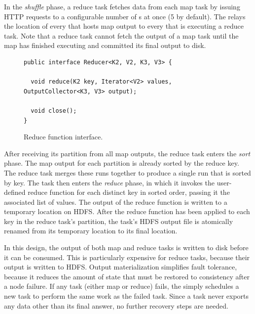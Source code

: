 In the \emph{shuffle} phase, a reduce task fetches data from each map task by
issuing HTTP requests to a configurable number of {\TT}s at once (5 by
default). The {\JT} relays the location of every {\TT} that hosts map output to
every {\TT} that is executing a reduce task. Note that a reduce task cannot
fetch the output of a map task until the map has finished executing and
committed its final output to disk.

\begin{figure}[t]
\ssp
\begin{minipage}{\linewidth}
\begin{verbatim}
public interface Reducer<K2, V2, K3, V3> {

  void reduce(K2 key, Iterator<V2> values, OutputCollector<K3, V3> output);

  void close();
}
\end{verbatim}

\end{minipage}
\caption{Reduce function interface.}
\label{fig:reducefunction}
\end{figure}

After receiving its partition from all map outputs, the reduce task enters the
\emph{sort} phase. The map output for each partition is already sorted by the
reduce key. The reduce task merges these runs together to produce a single run
that is sorted by key. The task then enters the \emph{reduce} phase, in which it
invokes the user-defined reduce function for each distinct key in sorted order,
passing it the associated list of values. The output of the reduce function is
written to a temporary location on HDFS\@. After the reduce function has been
applied to each key in the reduce task's partition, the task's HDFS output file
is atomically renamed from its temporary location to its final location.

In this design, the output of both map and reduce tasks is written to disk
before it can be consumed. This is particularly expensive for reduce tasks,
because their output is written to HDFS\@. Output materialization simplifies
fault tolerance, because it reduces the amount of state that must be restored to
consistency after a node failure. If any task (either map or reduce) fails, the
{\JT} simply schedules a new task to perform the same work as the failed
task. Since a task never exports any data other than its final answer, no
further recovery steps are needed.


